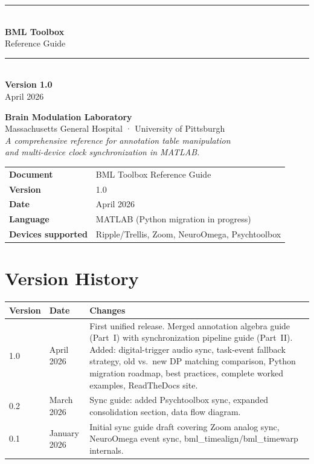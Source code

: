 \documentclass[11pt, a4paper]{report}
\newcommand{\bmlversion}{1.0}
\newcommand{\bmldate}{April 2026}
\begin{document}
\begin{titlepage}
\centering
\vspace*{2cm}
{\color{bmlblue}\rule{\textwidth}{2pt}}\\[0.8em]
{\fontsize{28}{34}\selectfont\bfseries\color{bmlblue} BML Toolbox}\\[0.4em]
{\fontsize{18}{22}\selectfont\color{gray} Reference Guide}\\[0.3em]
{\color{bmlblue}\rule{\textwidth}{2pt}}\\[1.5em]
{\Large\bfseries Version \bmlversion}\\[0.5em]
{\large\color{gray}\bmldate}\\[2em]

\begin{tcolorbox}[colback=boxbg,colframe=bmlblue!40,width=12cm]
\centering\small
\textbf{Brain Modulation Laboratory}\\
Massachusetts General Hospital · University of Pittsburgh\\[0.5em]
\textit{A comprehensive reference for annotation table manipulation\\
and multi-device clock synchronization in MATLAB.}
\end{tcolorbox}

\vfill
\begin{tabular}{ll}
\toprule
\textbf{Document} & BML Toolbox Reference Guide\\
\textbf{Version} & \bmlversion\\
\textbf{Date} & \bmldate\\
\textbf{Language} & MATLAB (Python migration in progress)\\
\textbf{Devices supported} & Ripple/Trellis, Zoom, NeuroOmega, Psychtoolbox\\
\bottomrule
\end{tabular}
\end{titlepage}

\chapter*{Version History}
\begin{center}
\begin{tabular}{L{1.5cm} L{2.5cm} L{9cm}}
\toprule
\textbf{Version} & \textbf{Date} & \textbf{Changes} \\
 & April 2026 &
  First unified release. Merged annotation algebra guide (Part~I)
  with synchronization pipeline guide (Part~II).
  Added: digital-trigger audio sync, task-event fallback strategy,
  old vs.\ new DP matching comparison, Python migration roadmap,
  best practices, complete worked examples, ReadTheDocs site. \\
 & March 2026 &
  Sync guide: added Psychtoolbox sync, expanded consolidation section,
  data flow diagram. \\
0.1 & January 2026 &
  Initial sync guide draft covering Zoom analog sync,
  NeuroOmega event sync, bml\_timealign/bml\_timewarp internals. \\
\bottomrule
\end{tabular}
\end{center}
\end{document}
